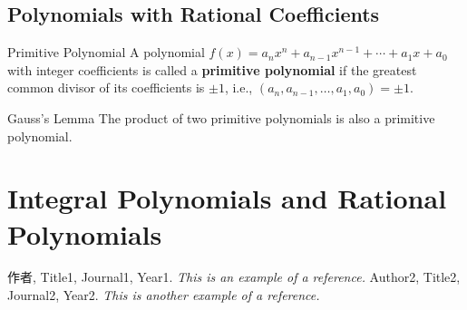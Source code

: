 \documentclass[11pt]{elegantbook}
\begin{document}
\section{Polynomials with Rational Coefficients}
\begin{definition}{Primitive Polynomial}
    A polynomial \( f(x) = a_n x^n + a_{n-1} x^{n-1} + \cdots + a_1 x + a_0 \) 
    with integer coefficients is called a \textbf{primitive polynomial}
    if the greatest common divisor of its coefficients is \(\pm 1\), 
    i.e., \( (a_n, a_{n-1}, \ldots, a_1, a_0) = \pm 1 \).
\end{definition}

\begin{lemma}{Gauss's Lemma}
    The product of two primitive polynomials is also a primitive polynomial.
\end{lemma}

\chapter{Integral Polynomials and Rational Polynomials}


\begin{thebibliography}{99} 
 作者, Title1, Journal1, Year1. \emph{ This is an example of a reference.}
 Author2, Title2, Journal2, Year2. \emph{ This is another example of a reference.}
\end{thebibliography}
\end{document}
